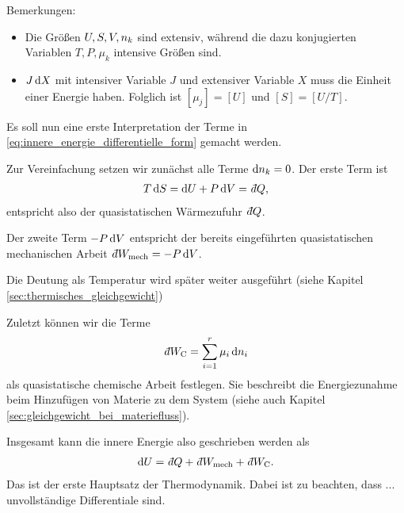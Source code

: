 Bemerkungen:
\begin{itemize}
    \item Die Größen $U, S,V,n_k$ sind extensiv, während die dazu konjugierten Variablen $T,P,\mu_k$ intensive Größen sind.
    \item $J\mathop{}\!\mathrm{d} X$ mit intensiver Variable $J$ und extensiver Variable $X$ muss die Einheit einer Energie haben. Folglich ist $[\mu_j] = [U]$ und $[S]=[U/T]$.
\end{itemize}

Es soll nun eine erste Interpretation der Terme in \eqref{eq:innere_energie_differentielle_form} gemacht werden.

Zur Vereinfachung setzen wir zunächst alle Terme $\mathop{}\!\mathrm{d} n_k=0$.
Der erste Term ist
\begin{align*}
    T\diff S = \diff U+ P\diff V = \udiff Q,
\end{align*}
entspricht also der quasistatischen Wärmezufuhr $\udiff Q$.

Der zweite Term $-P\mathop{}\!\mathrm{d} V$ entspricht der bereits eingeführten quasistatischen mechanischen Arbeit $\udiff W_\mathrm{mech}=-P\diff V$.


Die Deutung als Temperatur wird später weiter ausgeführt (siehe Kapitel \ref{sec:thermisches_gleichgewicht})

Zuletzt können wir die Terme
\begin{align*}
    \udiff W_ \mathrm{C} = \sum_{i = 1}^r \mu_i\diff \sm_i
\end{align*}
als quasistatische chemische Arbeit festlegen. Sie beschreibt die Energiezunahme beim Hinzufügen von Materie zu dem System (siehe auch Kapitel \ref{sec:gleichgewicht_bei_materiefluss}).

Insgesamt kann die innere Energie also geschrieben werden als
\begin{align}
    \label{eq:erster_HS_TD}
    \diff U = \udiff Q + \udiff W_\mathrm{mech} + \udiff W_\mathrm{C}.
\end{align}
Das ist der erste Hauptsatz der Thermodynamik.
Dabei ist zu beachten, dass ... unvollständige Differentiale sind.

